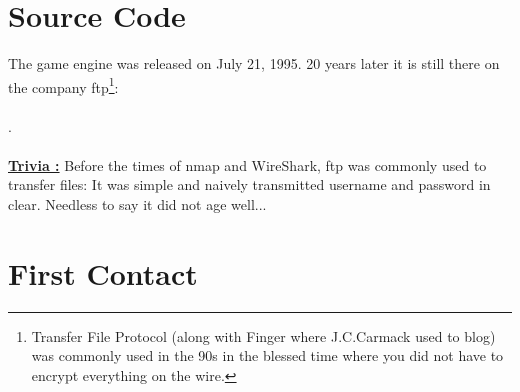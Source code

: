 \documentclass[book.tex]{subfiles}
\begin{document}
\section{Source Code}
The game engine was released on July 21, 1995. 20 years later it is still there on the company ftp\footnote{Transfer File Protocol (along with Finger where J.C.Carmack used to blog) was commonly used in the 90s in the blessed time where you did not have to encrypt everything on the wire.}:\\ 
\\.\\
\\
\textbf{\underline{Trivia :}} Before the times of nmap and WireShark, ftp was commonly used to transfer files: It was simple and naively transmitted username and password in clear. Needless to say it did not age well...\\

\section{First Contact}
\end{document}
